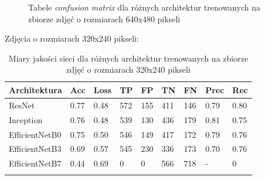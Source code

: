 \documentclass[polish,12pt]{aghthesis}
\begin{document}
\begin{figure}[h!]%
    \ContinuedFloat
    \begin{adjustbox}{minipage=1.0\paperwidth, pagecenter}
    \centering
    \end{adjustbox}
    \label{fig:sigmoid-640-480-matrices}
    \caption{Tabele \textit{confusion matrix} dla różnych architektur trenowanych na zbiorze zdjęć o rozmiarach 640x480 pikseli}
\end{figure}

\par\noindent Zdjęcia o rozmiarach 320x240 pikseli:
\renewcommand{\arraystretch}{1.6}
 \begin{longtable}[h!]{|m{2.6cm}|m{1.2cm}|m{1.2cm}|m{1.2cm}|m{1.2cm}|m{1.2cm}|m{1.2cm}|m{1.2cm}|m{1.2cm}|}
 \hline
 Architektura & Acc & Loss & TP & FP & TN & FN & Prec & Rec\\
 \hline
 ResNet & 0.77 & 0.48 & 572 & 155 & 411 & 146 & 0.79 & 0.80\\
 \hline
 Inception & 0.76 & 0.48 & 539 & 130 & 436 & 179 & 0.81 & 0.75\\
 \hline
 EfficientNetB0 & 0.75 & 0.50 & 546 & 149 & 417 & 172 & 0.79 & 0.76\\
 \hline
 EfficientNetB3 & 0.69 & 0.57 & 545 & 230 & 336 & 173 & 0.70 & 0.76 \\
 \hline
 EfficientNetB7 & 0.44 & 0.69 & 0 & 0 & 566 & 718 & - & 0 \\
 \hline
\caption{Miary jakości sieci dla różnych architektur trenowanych na zbiorze zdjęć o rozmiarach 320x240 pikseli}
\label{table:10}
\end{longtable}
\end{document}
